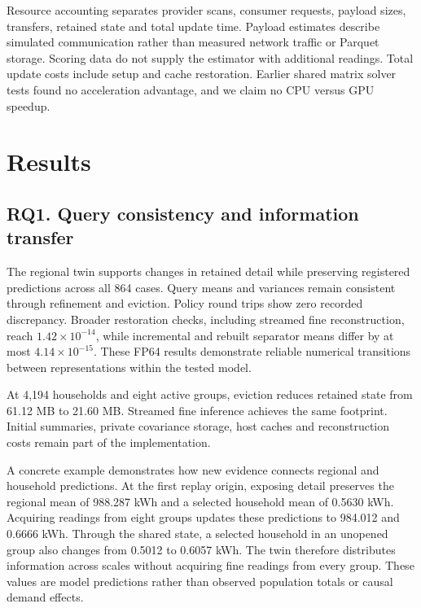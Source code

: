 \documentclass[conference]{IEEEtran}
\begin{document}
Resource accounting separates provider scans, consumer requests, payload sizes, transfers, retained state and total update time. Payload estimates describe simulated communication rather than measured network traffic or Parquet storage. Scoring data do not supply the estimator with additional readings. Total update costs include setup and cache restoration. Earlier shared matrix solver tests found no acceleration advantage, and we claim no CPU versus GPU speedup.









\section{Results}
\subsection{RQ1. Query consistency and information transfer}
The regional twin supports changes in retained detail while preserving registered predictions across all 864 cases. Query means and variances remain consistent through refinement and eviction. Policy round trips show zero recorded discrepancy. Broader restoration checks, including streamed fine reconstruction, reach $1.42\times10^{-14}$, while incremental and rebuilt separator means differ by at most $4.14\times10^{-15}$. These FP64 results demonstrate reliable numerical transitions between representations within the tested model.

At 4,194 households and eight active groups, eviction reduces retained state from 61.12 MB to 21.60 MB. Streamed fine inference achieves the same footprint. Initial summaries, private covariance storage, host caches and reconstruction costs remain part of the implementation.

A concrete example demonstrates how new evidence connects regional and household predictions. At the first replay origin, exposing detail preserves the regional mean of 988.287 kWh and a selected household mean of 0.5630 kWh. Acquiring readings from eight groups updates these predictions to 984.012 and 0.6666 kWh. Through the shared state, a selected household in an unopened group also changes from 0.5012 to 0.6057 kWh. The twin therefore distributes information across scales without acquiring fine readings from every group. These values are model predictions rather than observed population totals or causal demand effects.
\end{document}
